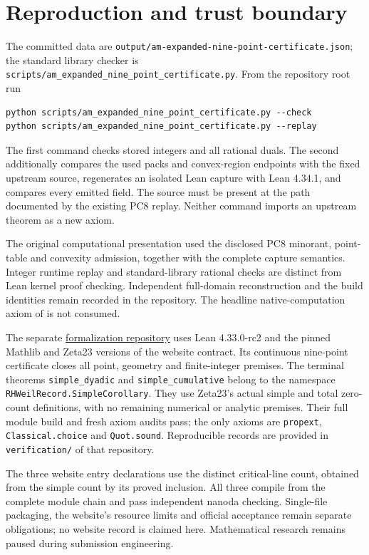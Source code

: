 \documentclass[11pt,a4paper]{article}
\begin{document}
\section{Reproduction and trust boundary}

The committed data are
\texttt{output/am-expanded-nine-point-certificate.json}; the standard
library checker is \texttt{scripts/am\_expanded\_nine\_point\_certificate.py}.
From the repository root run
\begin{verbatim}
python scripts/am_expanded_nine_point_certificate.py --check
python scripts/am_expanded_nine_point_certificate.py --replay
\end{verbatim}
The first command checks stored integers and all rational duals.
The second additionally compares the used packs and convex-region
endpoints with the fixed upstream source, regenerates an isolated Lean
capture with Lean 4.34.1, and compares every emitted field. The source
must be present at the path documented by the existing PC8 replay.
Neither command imports an upstream theorem as a new axiom.

The original computational presentation used the disclosed PC8 minorant,
point-table and convexity admission, together with the complete capture
semantics. Integer runtime replay and standard-library rational checks
are distinct from Lean kernel proof checking. Independent full-domain
reconstruction and the build identities remain recorded in the repository.
The headline native-computation axiom of \cite{Knaus} is not consumed.

The separate
\href{https://github.com/lixiang90/RH-Zero-Proportion-Formalization}
{formalization repository} uses Lean 4.33.0-rc2 and the pinned Mathlib
and Zeta23 versions of the website contract. Its continuous nine-point
certificate closes all point, geometry and finite-integer premises.
The terminal theorems \texttt{simple\_dyadic} and
\texttt{simple\_cumulative} belong to the namespace
\texttt{RHWeilRecord.\allowbreak SimpleCorollary}.
They use Zeta23's actual simple and total zero-count definitions, with
no remaining numerical or analytic premises. Their full module build and
fresh axiom audits pass; the only axioms are \texttt{propext},
\texttt{Classical.choice} and \texttt{Quot.sound}. Reproducible records
are provided in \texttt{verification/} of that repository.

The three website entry declarations use the distinct critical-line
count, obtained from the simple count by its proved inclusion. All three
compile from the complete module chain and pass independent nanoda
checking. Single-file packaging, the website's resource limits and
official acceptance remain separate obligations; no website record is
claimed here. Mathematical research remains paused during submission
engineering.
\end{document}
